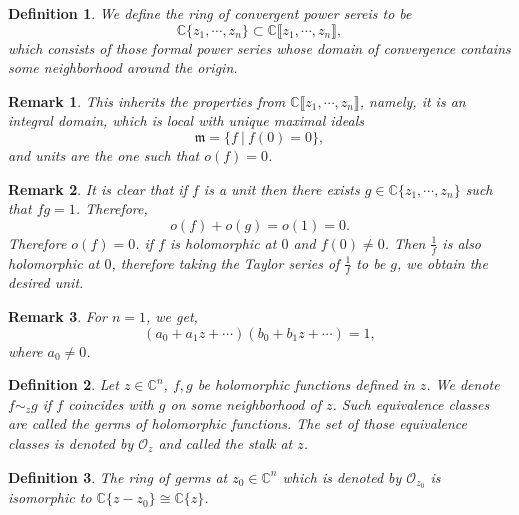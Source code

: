 \documentclass{article}
\newtheorem{definition}{Definition}[section]
\newtheorem{remark}{Remark}[section]
\newcommand{\C}[0]{\mathbb{C}}
\newcommand{\sep}[0]{\:|\:}
\newcommand{\order}[0]{o}
\newcommand{\Ouv}[0]{\mathcal{O}}
\begin{document}
\begin{definition}
  We define the ring of convergent power sereis to be 
  \begin{equation*}
    \C\{z_1,\cdots,z_n\}\subset\C\llbracket z_1,\cdots,z_n\rrbracket,
  \end{equation*}
  which consists of those formal power series whose domain of convergence contains some neighborhood around the origin.
\end{definition}
\begin{remark}
  This inherits the properties from $\C\llbracket z_1,\cdots,z_n\rrbracket$, namely, it is an integral domain, which is local with unique maximal ideals
  \begin{equation*}
    \mathfrak{m} = \{f\sep f(0) = 0\},
  \end{equation*}
  and units are the one such that $\order(f) = 0$.
\end{remark}

\begin{remark}
  It is clear that if $f$ is a unit then there exists $g\in\C\{z_1,\cdots,z_n\}$ such that $fg = 1$. Therefore,
  \begin{equation*}
    \order(f)+\order(g) = \order(1) = 0.
  \end{equation*}
  Therefore $\order(f) = 0$. if $f$ is holomorphic at $0$ and $f(0)\not= 0$. Then ${\frac 1 f}$ is also holomorphic at $0$, therefore taking the Taylor series of ${\frac 1 f}$ to be $g$, we obtain the desired unit.
\end{remark}

\begin{remark}
  For $n=1$, we get, 
  \begin{equation*}
    (a_0+a_1z+\cdots)(b_0+b_1z+\cdots) = 1,
  \end{equation*}
  where $a_0\not=0$.
\end{remark}

\begin{definition}
  Let $z\in\C^n$, $f,g$ be holomorphic functions defined in $z$. We denote $f\sim_z g$ if $f$ coincides with $g$ on some neighborhood of $z$. Such equivalence classes are called the germs of holomorphic functions. The set of those equivalence classes is denoted by $\Ouv_z$ and called the stalk at $z$.
\end{definition}

\begin{definition}
  The ring of germs at $z_0\in\C^n$ which is denoted by $\mathcal{O}_{z_0}$ is isomorphic to $\C\{z-z_0\} \cong \C\{z\}$.
\end{definition}
\end{document}
